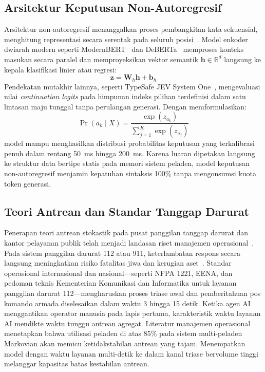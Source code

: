\documentclass[journal,compsoc]{IEEEtran}
\begin{document}
\subsection{Arsitektur Keputusan Non-Autoregresif}
Arsitektur non-autoregresif menanggalkan proses pembangkitan kata sekuensial, menghitung representasi secara serentak pada seluruh posisi~\cite{gu2018nonautoregressive}. Model enkoder dwiarah modern seperti ModernBERT~\cite{warner2024modernbert} dan DeBERTa~\cite{he2020deberta} memproses konteks masukan secara paralel dan memproyeksikan vektor semantik $\mathbf{h} \in \mathbb{R}^d$ langsung ke kepala klasifikasi linier atau regresi:
\begin{equation}
\mathbf{z} = \mathbf{W}_h \mathbf{h} + \mathbf{b}_h
\end{equation}
Pendekatan mutakhir lainnya, seperti TypeSafe JEV System One~\cite{typesafe2025systemone}, mengevaluasi nilai \textit{continuation logits} pada himpunan indeks pilihan terdefinisi dalam satu lintasan maju tunggal tanpa perulangan generasi. Dengan memformulasikan:
\begin{equation}
\Pr(a_k \mid X) = \frac{\exp(z_{a_k})}{\sum_{j=1}^{K} \exp(z_{a_j})}
\end{equation}
model mampu menghasilkan distribusi probabilitas keputusan yang terkalibrasi penuh dalam rentang 50~ms hingga 200~ms. Karena luaran dipetakan langsung ke struktur data bertipe statis pada memori sistem peladen, model keputusan non-autoregresif menjamin kepatuhan sintaksis 100\% tanpa mengonsumsi kuota token generasi.

\subsection{Teori Antrean dan Standar Tanggap Darurat}
Penerapan teori antrean stokastik pada pusat panggilan tanggap darurat dan kantor pelayanan publik telah menjadi landasan riset manajemen operasional~\cite{green2006queueing,mandelbaum2000delay}. Pada sistem panggilan darurat 112 atau 911, keterlambatan respons secara langsung meningkatkan risiko fatalitas jiwa dan kerugian aset~\cite{zandbergen2022accuracy}. Standar operasional internasional dan nasional—seperti NFPA 1221, EENA, dan pedoman teknis Kementerian Komunikasi dan Informatika untuk layanan panggilan darurat 112—mengharuskan proses triase awal dan pemberitahuan pos komando armada diselesaikan dalam waktu 3 hingga 15 detik. Ketika agen AI menggantikan operator manusia pada lapis pertama, karakteristik waktu layanan AI mendikte waktu tunggu antrean agregat. Literatur manajemen operasional menetapkan bahwa utilisasi peladen di atas 85\% pada sistem multi-peladen Markovian akan memicu ketidakstabilan antrean yang tajam. Menempatkan model dengan waktu layanan multi-detik ke dalam kanal triase bervolume tinggi melanggar kapasitas batas kestabilan antrean.
\end{document}
